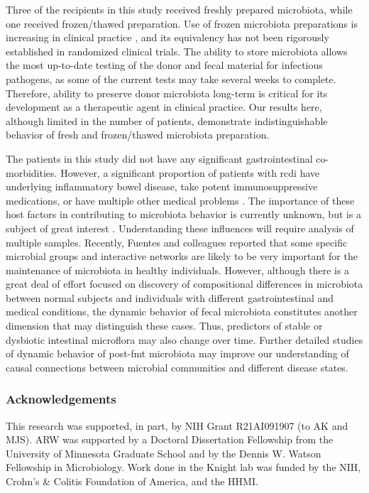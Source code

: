 Three of the recipients in this study received freshly prepared microbiota, while one received frozen/thawed preparation. Use of frozen microbiota preparations is increasing in clinical practice \cite{RN26}, and its equivalency has not been rigorously established in randomized clinical trials. The ability to store microbiota allows the most up-to-date testing of the donor and fecal material for infectious pathogens, as some of the current tests may take several weeks to complete. Therefore, ability to preserve donor microbiota long-term is critical for its development as a therapeutic agent in clinical practice. Our results here, although limited in the number of patients, demonstrate indistinguishable behavior of fresh and frozen/thawed microbiota preparation.

The patients in this study did not have any significant gastrointestinal co-morbidities. However, a significant proportion of patients with \gls{rcdi} have underlying inflammatory bowel disease, take potent immunosuppressive medications, or have multiple other medical problems \cite{RN45, RN85}. The importance of these host factors in contributing to microbiota behavior is currently unknown, but is a subject of great interest \cite{RN87}. Understanding these influences will require analysis of multiple samples. Recently, Fuentes and colleagues \cite{RN53moviefmt} reported that some specific microbial groups and interactive networks are likely to be very important for the maintenance of microbiota in healthy individuals. However, although there is a great deal of effort focused on discovery of compositional differences in microbiota between normal subjects and individuals with different gastrointestinal and medical conditions, the dynamic behavior of fecal microbiota constitutes another dimension that may distinguish these cases. Thus, predictors of stable or dysbiotic intestinal microflora may also change over time. Further detailed studies of dynamic behavior of post-\gls{fmt} microbiota may improve our understanding of causal connections between microbial communities and different disease states.   

\subsubsection{Acknowledgements}

This research was supported, in part, by NIH Grant R21AI091907 (to AK and MJS). ARW was supported by a Doctoral Dissertation Fellowship from the University of Minnesota Graduate School and by the Dennis W. Watson Fellowship in Microbiology. Work done in the Knight lab was funded by the NIH, Crohn's \& Colitis Foundation of America, and the HHMI.  
